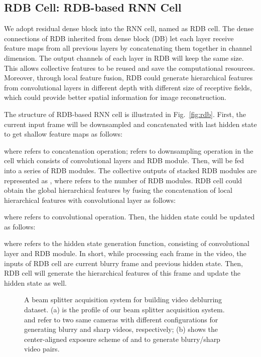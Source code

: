 \documentclass[twocolumn]{svjour3}          \smartqed  \usepackage{graphicx}
\begin{document}
\subsection{RDB Cell: RDB-based RNN Cell}
\label{sec:RDB}

We adopt residual dense block \cite{zhang2018residual, zhang2020residual} into the RNN cell, named as RDB cell. The dense connections of RDB inherited from dense block (DB) \cite{huang2017densely} let each layer receive feature maps from all previous layers by concatenating them together in channel dimension. The output channels of each layer in RDB will keep the same size. This allows collective features to be reused and save the computational resources. Moreover, through local feature fusion, RDB could generate hierarchical features from convolutional layers in different depth with different size of receptive fields, which could provide better spatial information for image reconstruction.

The structure of RDB-based RNN cell is illustrated in Fig.~\ref{fig:rdb}. First, the current input frame  will be downsampled and concatenated with last hidden state  to get shallow feature maps  as follows:

where  refers to concatenation operation;  refers to downsampling operation in the cell which consists of  convolutional layers and RDB module. Then,  will be fed into a series of RDB modules. The collective outputs of stacked RDB modules are represented as , where  refers to the number of RDB modules. RDB cell could obtain the global hierarchical features  by fusing the concatenation of local hierarchical features  with  convolutional layer as follows:

where  refers to convolutional operation. Then, the hidden state  could be updated as follows:

where  refers to the hidden state generation function, consisting of  convolutional layer and RDB module. In short, while processing each frame in the video, the inputs of RDB cell are current blurry frame and previous hidden state. Then, RDB cell will generate the hierarchical features of this frame and update the hidden state as well.

\begin{figure*}[!ht]
	\centering
{}
	\hfil
	\caption{A beam splitter acquisition system for building video deblurring dataset. (a) is the profile of our beam splitter acquisition system.  and  refer to two same cameras with different configurations for generating blurry and sharp videos, respectively; (b) shows the center-aligned exposure scheme of  and  to generate blurry/sharp video pairs.}
	\label{fig:system}
\end{figure*}
\end{document}
